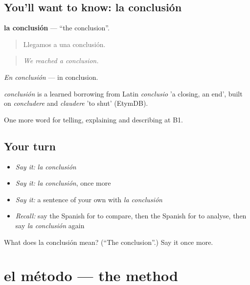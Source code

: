 \subsection*{You'll want to know: la conclusión}
\textbf{la conclusión} — \textquotedblleft{}the conclusion\textquotedblright{}.

\begin{quote}
Llegamos a una conclusión.
\end{quote}

\begin{quote}
\emph{We reached a conclusion.}
\end{quote}

\emph{En conclusión} — in conclusion.

\begin{cousinweb}
\emph{conclusión} is a learned borrowing from Latin \emph{conclusio} 'a closing, an end', built on \emph{concludere} and \emph{claudere} 'to shut' (EtymDB).
\end{cousinweb}

\begin{grammarlens}[title={What you've built}]
One more word for telling, explaining and describing at B1.
\end{grammarlens}

\subsection*{Your turn}
\begin{itemize}
\raggedright
  \item \emph{Say it:} \emph{la conclusión}
  \item \emph{Say it:} \emph{la conclusión}, once more
  \item \emph{Say it:} a sentence of your own with \emph{la conclusión}
  \item \emph{Recall:} say the Spanish for to compare, then the Spanish for to analyse, then say \emph{la conclusión} again
\end{itemize}

\begin{tcolorbox}[breakable,colback=teal!4,colframe=teal!35!black,title={Before you move on}]
What does la conclusión mean? (\textquotedblleft{}The conclusion\textquotedblright{}.) Say it once more.
\end{tcolorbox}
\section[el método]{el método — the method}

